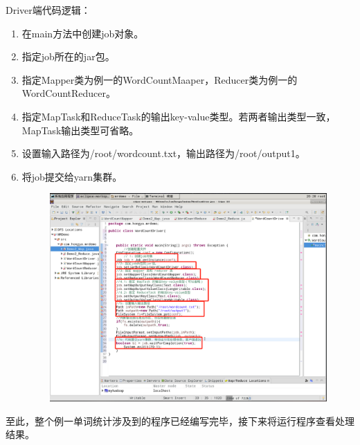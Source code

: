 \documentclass {article}
\begin{document}
				Driver端代码逻辑：
				\begin{enumerate}
					\item 在main方法中创建job对象。
					\item 指定job所在的jar包。
					\item 指定Mapper类为例一的WordCountMaaper，Reducer类为例一的WordCountReducer。
					\item 指定MapTask和ReduceTask的输出key-value类型。若两者输出类型一致，MapTask输出类型可省略。
					\item 设置输入路径为/root/wordcount.txt，输出路径为/root/output1。
					\item 将job提交给yarn集群。
					\begin{figure}[H]
						\centering
						\includegraphics[width=4.5in]{figures/fig9.png}
					\end{figure}
				\end{enumerate}
			
				至此，整个例一单词统计涉及到的程序已经编写完毕，接下来将运行程序查看处理结果。
				
\end{document}
